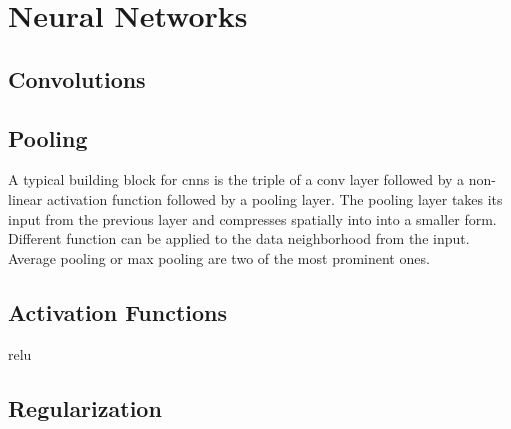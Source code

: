 \section{Neural Networks}
\label{sec:concepts:nn}

\subsection{Convolutions} %
\label{sub:conepts:nn:conv}

\subsection{Pooling}
\label{sub:concepts:nn:pooling}
A typical building block for \glspl{cnn} is the triple of a \gls{conv} layer followed by a non-linear activation function followed by a pooling layer. The pooling layer takes its input from the previous layer and compresses spatially into into a smaller form. Different function can be applied to the data neighborhood from the input. Average pooling \citep{lecun_handwritten_1990} or max pooling \citep{zhou_computation_1988} are two of the most prominent ones.

\subsection{Activation Functions} %
\label{sub:conepts:nn:activations}
\gls{relu}

\subsection{Regularization} %
\label{sub:conepts:nn:regularization}

